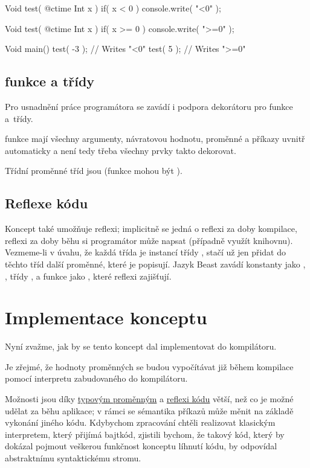 \begin{code}
Void test( @ctime Int x )
	if( x < 0 )
{
	console.write( "<0" );
}

Void test( @ctime Int x )
	if( x >= 0 )
{
	console.write( ">=0" );
}

Void main() {
	test( -3 ); // Writes "<0"
	test( 5 ); // Writes ">=0"
}
\end{code}

\subsection{\ctime funkce a třídy}
Pro usnadnění práce programátora se zavádí i podpora dekorátoru  pro funkce a~třídy.

\ctime funkce mají všechny argumenty, návratovou hodnotu, proměnné a příkazy uvnitř automaticky \ctime a není tedy třeba všechny prvky takto dekorovat.

Třídní proměnné \ctime tříd jsou \ctime (funkce mohou být \nonctime).

\subsection{Reflexe kódu} \label{ctime:reflection}
Koncept také umožňuje reflexi; implicitně se jedná o reflexi za doby kompilace, reflexi za doby běhu si programátor může napsat (případně využít knihovnu). Vezmeme-li v úvahu, že každá třída je instancí \ctime třídy , stačí už jen přidat do těchto tříd další \ctime proměnné, které je popisují. Jazyk Beast zavádí \ctime konstanty jako , , třídy ,  a funkce jako , které reflexi zajišťují.

\section{Implementace konceptu} \label{ctime:orderInterpreters}
Nyní zvažme, jak by se tento koncept dal implementovat do kompilátoru.

Je zřejmé, že hodnoty \ctime proměnných se budou vypočítávat již během kompilace pomocí interpretu zabudovaného do kompilátoru.

Možnosti \ctime jsou díky \hyperref[ctime:typeVars]{typovým proměnným} a \hyperref[ctime:reflection]{reflexi kódu} větší, než co je možné udělat za běhu aplikace; v rámci \ctime se sémantika příkazů může měnit na základě vykonání jiného \ctime kódu. Kdybychom zpracování \ctime chtěli realizovat klasickým interpretem, který přijímá bajtkód, zjistili bychom, že takový kód, který by dokázal pojmout veškerou funkčnost konceptu líhnutí kódu, by odpovídal abstraktnímu syntaktickému stromu.

